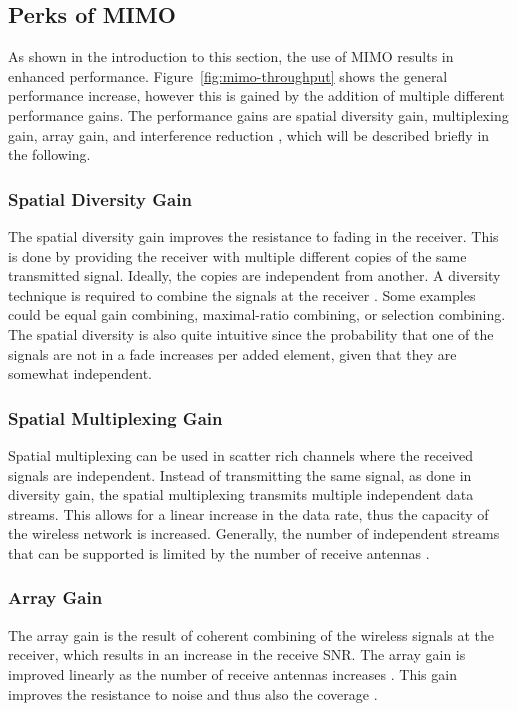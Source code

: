\subsection{Perks of MIMO} 
As shown in the introduction to this section, the use of MIMO results in enhanced performance. Figure~\ref{fig:mimo-throughput} shows the general performance increase, however this is gained by the addition of multiple different performance gains. The performance gains are spatial diversity gain, multiplexing gain, array gain, and interference reduction \cite{Ezio2007MIMO}, which will be described briefly in the following.

\subsubsection{Spatial Diversity Gain}
The spatial diversity gain improves the resistance to fading in the receiver. This is done by providing the receiver with multiple different copies of the same transmitted signal. Ideally, the copies are independent from another. A diversity technique is required to combine the signals at the receiver \cite{Ezio2007MIMO}. Some examples could be equal gain combining, maximal-ratio combining, or selection combining. The spatial diversity is also quite intuitive since the probability that one of the signals are not in a fade increases per added element, given that they are somewhat independent. 
 
\subsubsection{Spatial Multiplexing Gain}
Spatial multiplexing can be used in scatter rich channels where the received signals are independent. Instead of transmitting the same signal, as done in diversity gain, the spatial multiplexing transmits multiple independent data streams. This allows for a linear increase in the data rate, thus the capacity of the wireless network is increased. Generally, the number of independent streams that can be supported is limited by the number of receive antennas \cite{Tim2012Practical}.

\subsubsection{Array Gain}
The array gain is the result of coherent combining of the wireless signals at the receiver, which results in an increase in the receive SNR. The array gain is improved linearly as the number of receive antennas increases \cite{tse2005fundamentals}. This gain improves the resistance to noise and thus also the coverage \cite{Tim2012Practical}.
  
